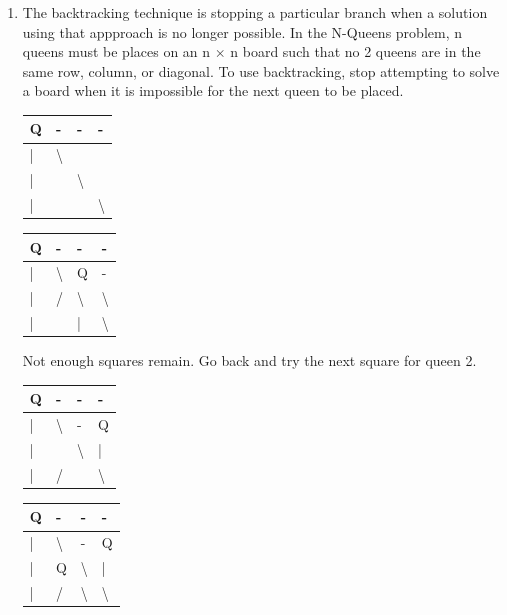 \documentclass{article}
\begin{document}
\begin{enumerate}
\item 

    The backtracking technique is stopping a particular branch when a solution using that appproach is no longer possible. In the N-Queens problem, n queens must be places on an n $\times$ n board such that no 2 queens are in the same row, column, or diagonal. To use backtracking, stop attempting to solve a board when it is impossible for the next queen to be placed. 

    \begin{table}[H]
        \begin{tabular}{|l|l|l|l|}
        \hline
        Q & - & - & - \\ \hline
        | & \textbackslash{} &  &  \\ \hline
        | &  & \textbackslash{} &  \\ \hline
        | &  &  & \textbackslash{} \\ \hline
        \end{tabular}
    \end{table}

\begin{table}[H]
\begin{tabular}{|l|l|l|l|}
\hline
Q & - & - & - \\ \hline
| & \textbackslash{} & Q & - \\ \hline
| & / & \textbackslash{} & \textbackslash{} \\ \hline
| &  & | & \textbackslash{} \\ \hline
\end{tabular}
\end{table}


Not enough squares remain. Go back and try the next square for queen 2. 

\begin{table}[H]
\begin{tabular}{|l|l|l|l|}
\hline
Q & - & - & - \\ \hline
| & \textbackslash{} & - & Q \\ \hline
| &  & \textbackslash{} & | \\ \hline
| & / &  & \textbackslash{} \\ \hline
\end{tabular}
\end{table}


\begin{table}[H]
\begin{tabular}{|l|l|l|l|}
\hline
Q & - & - & - \\ \hline
| & \textbackslash{} & - & Q \\ \hline
| & Q & \textbackslash{} & | \\ \hline
| & / & \textbackslash{} & \textbackslash{} \\ \hline
\end{tabular}
\end{table}


\end{enumerate}
\end{document}
